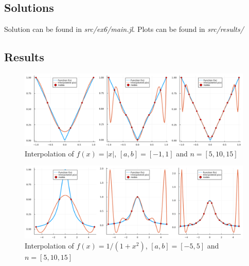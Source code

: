 \documentclass[11pt]{article}
\begin{document}
\subsection*{Solutions}
Solution can be found in \textit{src/ex6/main.jl}. Plots can be found in \textit{src/results/}
\subsection*{Results}
\begin{figure}[h]
    \centering
    \includegraphics[width=1\textwidth]{ex6_plot1.png}
    \caption{Interpolation of $f(x)=|x|$, $[a,b] = [-1,1]$ and $n = [5,10,15]$}
\end{figure}
\begin{figure}[h]
    \centering
    \includegraphics[width=1\textwidth]{ex6_plot2.png}
    \caption{Interpolation of $f(x)=1/(1+x^2)$, $[a,b] = [-5,5]$ and $n = [5,10,15]$}
\end{figure}
\end{document}
